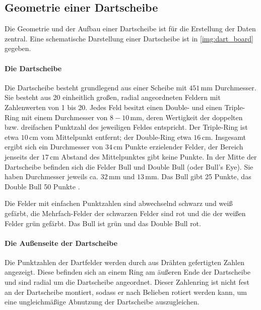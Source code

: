 
\subsection{Geometrie einer Dartscheibe}  %
\label{sec:dartscheiben_geometrie}

Die Geometrie und der Aufbau einer Dartscheibe ist für die Erstellung der Daten zentral. Eine schematische Darstellung einer Dartscheibe ist in \autoref{img:dart_board} gegeben.

\paragraph{Die Dartscheibe}

Die Dartscheibe besteht grundlegend aus einer Scheibe mit $451\,\text{mm}$ Durchmesser. Sie besteht aus 20 einheitlich großen, radial angeordneten Feldern mit Zahlenwerten von 1 bis 20. Jedes Feld besitzt einen Double- und einen Triple-Ring mit einem Durchmesser von $8-10\,\text{mm}$, deren Wertigkeit der doppelten bzw. dreifachen Punktzahl des jeweiligen Feldes entspricht. Der Triple-Ring ist etwa $10\,\text{cm}$ vom Mittelpunkt entfernt; der Double-Ring etwa $16\,\text{cm}$. Insgesamt ergibt sich ein Durchmesser von $34\,\text{cm}$ Punkte erzielender Felder, der Bereich jenseits der $17\,\text{cm}$ Abstand des Mittelpunktes gibt keine Punkte. In der Mitte der Dartscheibe befinden sich die Felder Bull und Double Bull (oder Bull's Eye). Sie haben Durchmesser jeweils ca. $32\,\text{mm}$ und $13\,\text{mm}$. Das Bull gibt 25 Punkte, das Double Bull 50 Punkte \cite{wdf-rules}.

Die Felder mit einfachen Punktzahlen sind abwechselnd schwarz und weiß gefärbt, die Mehrfach-Felder der schwarzen Felder sind rot und die der weißen Felder grün gefärbt. Das Bull ist grün und das Double Bull rot.

\paragraph{Die Außenseite der Dartscheibe}

Die Punktzahlen der Dartfelder werden durch aus Drähten gefertigten Zahlen angezeigt. Diese befinden sich an einem Ring am äußeren Ende der Dartscheibe und sind radial um die Dartscheibe angeordnet. Dieser Zahlenring ist nicht fest an der Dartscheibe montiert, sodass er nach Belieben rotiert werden kann, um eine ungleichmäßige Abnutzung der Dartscheibe auszugleichen.

